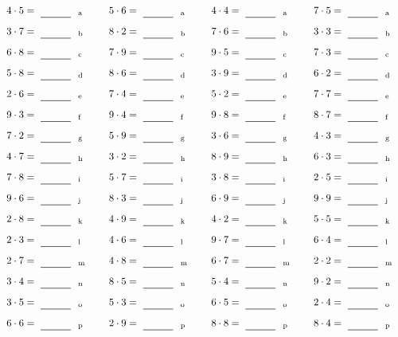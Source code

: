 \documentclass
[
  draft    = true,
  fontsize = 11pt,
  parskip  = half-
]
{scrartcl}
\begin{document}
\par\vfill\par
\begin{align*}
    \pline{4\cdot5}&=\rline{a}
  & \pline{5\cdot6}&=\rline{a}
  & \pline{4\cdot4}&=\rline{a}
  & \pline{7\cdot5}&=\rline{a} \\[1ex]
    \pline{3\cdot7}&=\rline{b}
  & \pline{8\cdot2}&=\rline{b}
  & \pline{7\cdot6}&=\rline{b}
  & \pline{3\cdot3}&=\rline{b} \\[1ex]
    \pline{6\cdot8}&=\rline{c}
  & \pline{7\cdot9}&=\rline{c}
  & \pline{9\cdot5}&=\rline{c}
  & \pline{7\cdot3}&=\rline{c} \\[1ex]
    \pline{5\cdot8}&=\rline{d}
  & \pline{8\cdot6}&=\rline{d}
  & \pline{3\cdot9}&=\rline{d}
  & \pline{6\cdot2}&=\rline{d} \\[1ex]
    \pline{2\cdot6}&=\rline{e}
  & \pline{7\cdot4}&=\rline{e}
  & \pline{5\cdot2}&=\rline{e}
  & \pline{7\cdot7}&=\rline{e} \\[1ex]
    \pline{9\cdot3}&=\rline{f}
  & \pline{9\cdot4}&=\rline{f}
  & \pline{9\cdot8}&=\rline{f}
  & \pline{8\cdot7}&=\rline{f} \\[1ex]
    \pline{7\cdot2}&=\rline{g}
  & \pline{5\cdot9}&=\rline{g}
  & \pline{3\cdot6}&=\rline{g}
  & \pline{4\cdot3}&=\rline{g} \\[1ex]
    \pline{4\cdot7}&=\rline{h}
  & \pline{3\cdot2}&=\rline{h}
  & \pline{8\cdot9}&=\rline{h}
  & \pline{6\cdot3}&=\rline{h} \\[1ex]
    \pline{7\cdot8}&=\rline{i}
  & \pline{5\cdot7}&=\rline{i}
  & \pline{3\cdot8}&=\rline{i}
  & \pline{2\cdot5}&=\rline{i} \\[1ex]
    \pline{9\cdot6}&=\rline{j}
  & \pline{8\cdot3}&=\rline{j}
  & \pline{6\cdot9}&=\rline{j}
  & \pline{9\cdot9}&=\rline{j} \\[1ex]
    \pline{2\cdot8}&=\rline{k}
  & \pline{4\cdot9}&=\rline{k}
  & \pline{4\cdot2}&=\rline{k}
  & \pline{5\cdot5}&=\rline{k} \\[1ex]
    \pline{2\cdot3}&=\rline{l}
  & \pline{4\cdot6}&=\rline{l}
  & \pline{9\cdot7}&=\rline{l}
  & \pline{6\cdot4}&=\rline{l} \\[1ex]
    \pline{2\cdot7}&=\rline{m}
  & \pline{4\cdot8}&=\rline{m}
  & \pline{6\cdot7}&=\rline{m}
  & \pline{2\cdot2}&=\rline{m} \\[1ex]
    \pline{3\cdot4}&=\rline{n}
  & \pline{8\cdot5}&=\rline{n}
  & \pline{5\cdot4}&=\rline{n}
  & \pline{9\cdot2}&=\rline{n} \\[1ex]
    \pline{3\cdot5}&=\rline{o}
  & \pline{5\cdot3}&=\rline{o}
  & \pline{6\cdot5}&=\rline{o}
  & \pline{2\cdot4}&=\rline{o} \\[1ex]
    \pline{6\cdot6}&=\rline{p}
  & \pline{2\cdot9}&=\rline{p}
  & \pline{8\cdot8}&=\rline{p}
  & \pline{8\cdot4}&=\rline{p}
\end{align*}
\end{document}
